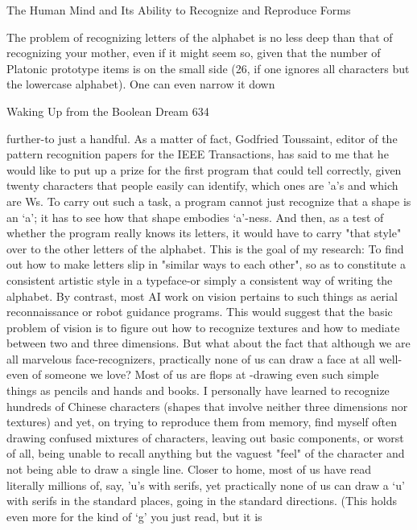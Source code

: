                    The Human Mind and Its Ability to Recognize
                            and Reproduce Forms

       The problem of recognizing letters of the alphabet is no less deep than that of
recognizing your mother, even if it might seem so, given that the number of Platonic
prototype items is on the small side (26, if one ignores all characters but the lowercase
alphabet). One can even narrow it down




Waking Up from the Boolean Dream                                                       634

further-to just a handful. As a matter of fact, Godfried Toussaint, editor of the pattern
recognition papers for the IEEE Transactions, has said to me that he would like to put
up a prize for the first program that could tell correctly, given twenty characters that
people easily can identify, which ones are 'a's and which are Ws. To carry out such a
task, a program cannot just recognize that a shape is an `a'; it has to see how that
shape embodies `a'-ness. And then, as a test of whether the program really knows its
letters, it would have to carry "that style" over to the other letters of the alphabet. This
is the goal of my research: To find out how to make letters slip in "similar ways to
each other", so as to constitute a consistent artistic style in a typeface-or simply a
consistent way of writing the alphabet.
         By contrast, most AI work on vision pertains to such things as aerial
reconnaissance or robot guidance programs. This would suggest that the basic
problem of vision is to figure out how to recognize textures and how to mediate
between two and three dimensions. But what about the fact that although we are all
marvelous face-recognizers, practically none of us can draw a face at all well-even of
someone we love? Most of us are flops at -drawing even such simple things as pencils
and hands and books. I personally have learned to recognize hundreds of Chinese
characters (shapes that involve neither three dimensions nor textures) and yet, on
trying to reproduce them from memory, find myself often drawing confused mixtures
of characters, leaving out basic components, or worst of all, being unable to recall
anything but the vaguest "feel" of the character and not being able to draw a single
line.
         Closer to home, most of us have read literally millions of, say, 'u's with serifs,
yet practically none of us can draw a `u' with serifs in the standard places, going in the
standard directions. (This holds even more for the kind of `g' you just read, but it is
